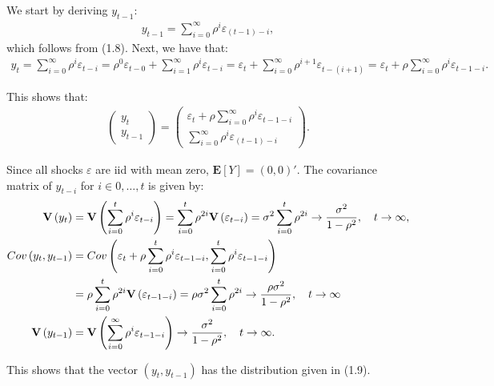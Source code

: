 \documentclass[11pt,a4paper,oneside]{article}
\newcommand{\lp}{\left(}
\newcommand{\rp}{\right)}
\newcommand{\rb}{\right]}
\newcommand{\lb}{\left[}
\newcommand{\ee}{\mathbf{E}}
\newcommand{\vv}{\mathbf{V}}
\begin{document}
We start by deriving $y_{t-1}$:
\begin{align}
    y_{t-1} = \sum_{i=0}^\infty \rho^i \varepsilon_{\lp t - 1\rp - i},
\end{align}
which follows from (1.8). Next, we have that:
\begin{align}
    y_t 
        = \sum_{i=0}^\infty \rho^i \varepsilon_{t-i}
        = \rho^0 \varepsilon_{t-0} + \sum_{i = 1}^\infty \rho^{i}\varepsilon_{t - i}
        = \varepsilon_t + \sum_{i = 0}^\infty\rho^{i + 1}\varepsilon_{t - \lp i + 1\rp}
        = \varepsilon_t + \rho\sum_{i=0}^\infty\rho^i\varepsilon_{t-1-i}.
\end{align}

This shows that:
\begin{align}
    \begin{pmatrix} y_t \\ y_{t-1} \end{pmatrix} 
    =
        \begin{pmatrix}
            \varepsilon_t + \rho\sum_{i=0}^\infty\rho^i\varepsilon_{t-1-i} \\
            \sum_{i=0}^\infty \rho^i \varepsilon_{\lp t - 1\rp - i}
        \end{pmatrix}.
\end{align}

Since all shocks $\varepsilon$ are iid with mean zero, $\ee\lb Y\rb = \lp 0, 0\rp'$. The covariance matrix of $y_{t-i}$ for $i \in 0, \dots, t$ is given by:
\begin{align}
    \vv\lp y_t\rp 
        &=\vv\lp \sum_{i=0}^t \rho^i \varepsilon_{t-i}\rp 
        = \sum_{i=0}^t \rho^{2i}\vv\lp \varepsilon_{t-i}\rp 
        = \sigma^2\sum_{i=0}^t \rho^{2i} \rightarrow \frac{\sigma^2}{1 - \rho^2}, \quad t\rightarrow \infty, \\
    Cov\lp y_t, y_{t-1}\rp 
        &= Cov\lp \varepsilon_t + \rho\sum_{i=0}^t \rho^i\varepsilon_{t-1-i}, \sum_{i=0}^t \rho^i\varepsilon_{t-1-i}\rp \notag \\ 
        &= \rho \sum_{i=0}^t \rho^{2i}\vv\lp \varepsilon_{t-1-i}\rp
        = \rho \sigma^2\sum_{i=0}^t\rho^{2i} \rightarrow \frac{\rho\sigma^2}{1 - \rho^2}, \quad t \rightarrow \infty \\
    \vv\lp y_{t-1}\rp
        &=\vv\lp \sum_{i=0}^\infty \rho^i \varepsilon_{t-1-i}\rp \rightarrow \frac{\sigma^2}{1 - \rho^2}, \quad t \rightarrow \infty.
\end{align}

This shows that the vector $\lp y_t, y_{t-1}\rp$ has the distribution given in (1.9).
\end{document}
